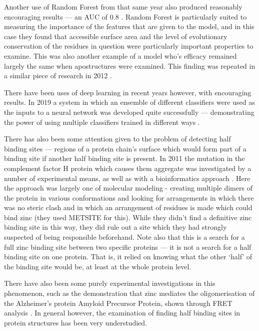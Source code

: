 Another use of Random Forest from that same year also produced reasonably encouraging results --- an AUC of 0.8 \cite{bordner2008}. Random Forest is particularly suited to measuring the importance of the features that are given to the model, and in this case they found that accessible surface area and the level of evolutionary conservation of the residues in question were particularly important properties to examine. This was also another example of a model who's efficacy remained largely the same when apostructures were examined. This finding was repeated in a similar piece of research in 2012 \cite{zheng2012}.

There have been uses of deep learning in recent years however, with encouraging results. In 2019 a system in which an ensemble of different classifiers were used as the inputs to a neural network was developed quite successfully --- demonstrating the power of using multiple classifiers trained in different ways \cite{li2019}.


There has also been some attention given to the problem of detecting half binding sites --- regions of a protein chain's surface which would form part of a binding site if another half binding site is present. In 2011 the mutation in the complement factor H protein which causes them aggregate was investigated by a number of experimental means, as well as with a bioinformatics approach \cite{nan2011zinc}. Here the approach was largely one of molecular modeling - creating multiple dimers of the protein in various conformations and looking for arrangements in which there was no steric clash and in which an arrangement of residues is made which could bind zinc (they used METSITE for this). While they didn't find a definitive zinc binding site in this way, they did rule out a site which they had strongly suspected of being responsible beforehand. Note also that this is a search for a full zinc binding site between two specific proteins --- it is not a search for a half binding site on one protein. That is, it relied on knowing what the other `half' of the binding site would be, at least at the whole protein level.

There have also been some purely experimental investigations in this phenomenon, such as the demonstration that zinc mediates the oligomerisation of the Alzheimer's protein Amyloid Precursor Protein, shown through FRET analysis \cite{mayer2014novel}. In general however, the examination of finding half binding sites in protein structures has been very understudied.

